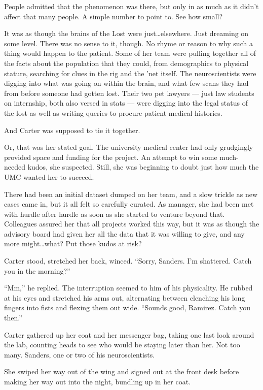 People admitted that the phenomenon was there, but only in as much as it didn't affect that many people. A simple number to point to. See how small?

It was as though the brains of the Lost were just\ldots{}elsewhere. Just dreaming on some level. There was no sense to it, though. No rhyme or reason to why such a thing would happen to the patient. Some of her team were pulling together all of the facts about the population that they could, from demographics to physical stature, searching for clues in the rig and the 'net itself. The neuroscientists were digging into what was going on within the brain, and what few scans they had from before someone had gotten lost. Their two pet lawyers --- just law students on internship, both also versed in stats --- were digging into the legal status of the lost as well as writing queries to procure patient medical histories.

And Carter was supposed to tie it together.

Or, that was her stated goal. The university medical center had only grudgingly provided space and funding for the project. An attempt to win some much-needed kudos, she suspected. Still, she was beginning to doubt just how much the UMC wanted her to succeed.

There had been an initial dataset dumped on her team, and a slow trickle as new cases came in, but it all felt so carefully curated. As manager, she had been met with hurdle after hurdle as soon as she started to venture beyond that. Colleagues assured her that all projects worked this way, but it was as though the advisory board had given her all the data that it was willing to give, and any more might\ldots{}what? Put those kudos at risk?

Carter stood, stretched her back, winced. ``Sorry, Sanders. I'm shattered. Catch you in the morning?''

``Mm,'' he replied. The interruption seemed to him of his physicality. He rubbed at his eyes and stretched his arms out, alternating between clenching his long fingers into fists and flexing them out wide. ``Sounds good, Ramirez. Catch you then.''

Carter gathered up her coat and her messenger bag, taking one last look around the lab, counting heads to see who would be staying later than her. Not too many. Sanders, one or two of his neuroscientists.

She swiped her way out of the wing and signed out at the front desk before making her way out into the night, bundling up in her coat.

